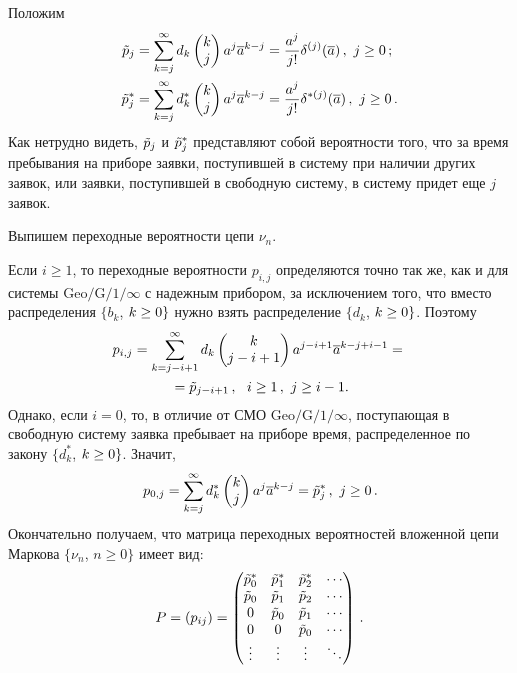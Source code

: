 \begin{multicols}{2}
Положим
\begin{align*}
\tilde p_{j} &= \sum_{k=j}^\infty d_k \begin{pmatrix}k \\ j\end{pmatrix} a^{j} \overline a^{k-j}=
\displaystyle\frac{\displaystyle a^{j} \mathstrut}{\displaystyle j!\mathstrut} \delta^{(j)}(\overline a)\,,
\  j\ge 0\,;
\\
\tilde p^*_{j} &= \sum_{k=j}^\infty d^*_k \begin{pmatrix}k \\ j\end{pmatrix}
a^{j} \overline a^{k-j} =
\displaystyle\frac{\displaystyle a^{j} \mathstrut}{\displaystyle j!\mathstrut} \delta^{*(j)}(\overline a)\,,
 \ j\ge 0\,.
\end{align*}
Как нетрудно видеть, $\tilde p_{j}$ и  $\tilde p^*_{j}$ представляют
собой вероятности того, что за время пребывания на приборе
заявки, поступившей в систему при наличии других заявок,
или заявки, поступившей в свободную систему,
в систему придет еще $j$ заявок.

Выпишем переходные вероятности цепи $\nu _{n}$.

Если $i\ge 1$, то переходные вероятности $p_{i,j}$ определяются
точно так же, как и для системы $\mbox{Geo}/\mbox{G}/1/\infty$ с надежным
прибором, за исключением того, что
вместо распределения $\{b_k$, $k\hm\ge 0\}$ нужно взять
распределение $\{d_k$, $k\hm\ge 0\}$.
Поэтому
\begin{multline*}
p_{i,j} = \sum_{k=j-i+1}^\infty d_k \begin{pmatrix}k \\ j-i+1\end{pmatrix} a^{j-i+1}
\overline a^{k-j+i-1}
={}\\
{}= \tilde p_{j-i+1}\,, \ \ i\ge 1\,,
 \ j\ge i-1.
\end{multline*}
Однако, если $i=0$, то, в отличие от СМО $\mbox{Geo}/\mbox{G}/1/\infty$,
поступающая в свободную систему заявка пребывает на приборе
время, распределенное по закону $\{d^{*}_k$, $k\hm\ge 0\}$.
Значит,
$$
p_{0,j} = \sum\limits_{k=j}^\infty d^*_k \begin{pmatrix}k \\ j\end{pmatrix} a^{j} \overline a^{k-j}
= \tilde p^*_{j}\,,  \ j\ge 0\,.
$$
Окончательно получаем, что матрица переходных
вероятностей вложенной цепи Маркова
$\{\nu _{n}$, $n\ge 0\}$ имеет вид:
$$
P= (p_{ij}) =
\begin{pmatrix}
\tilde p^*_0 &   \tilde p^*_1 &  \tilde p^*_2 &  \cdots \\
\tilde p_0   &   \tilde p_1   &  \tilde p_2   &  \cdots \\
0       &   \tilde p_0   &  \tilde p_1   &  \cdots \\
0       &   0       &  \tilde p_0   &  \cdots \\
\vdots  &   \vdots  &  \vdots  &  \ddots
\end{pmatrix}\,.
$$


\end{multicols}
